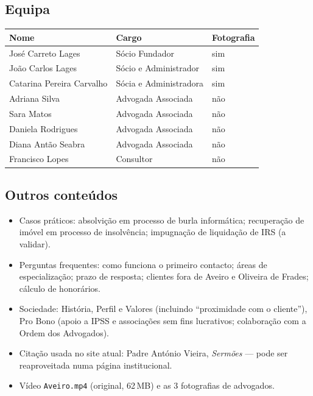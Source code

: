 \documentclass[11pt,a4paper]{article}
\begin{document}
\subsection*{Equipa}
\begin{center}
\begin{tabular}{lll}
\toprule
\textbf{Nome} & \textbf{Cargo} & \textbf{Fotografia} \\
\midrule
José Carreto Lages & Sócio Fundador & sim \\
João Carlos Lages & Sócio e Administrador & sim \\
Catarina Pereira Carvalho & Sócia e Administradora & sim \\
Adriana Silva & Advogada Associada & não \\
Sara Matos & Advogada Associada & não \\
Daniela Rodrigues & Advogada Associada & não \\
Diana Antão Seabra & Advogada Associada & não \\
Francisco Lopes & Consultor & não \\
\bottomrule
\end{tabular}
\end{center}

\subsection*{Outros conteúdos}
\begin{itemize}
  \item Casos práticos: absolvição em processo de burla informática; recuperação de imóvel em processo de insolvência; impugnação de liquidação de IRS (a validar).
  \item Perguntas frequentes: como funciona o primeiro contacto; áreas de especialização; prazo de resposta; clientes fora de Aveiro e Oliveira de Frades; cálculo de honorários.
  \item Sociedade: História, Perfil e Valores (incluindo ``proximidade com o cliente''), Pro Bono (apoio a IPSS e associações sem fins lucrativos; colaboração com a Ordem dos Advogados).
  \item Citação usada no site atual: Padre António Vieira, \textit{Sermões} --- pode ser reaproveitada numa página institucional.
  \item Vídeo \texttt{Aveiro.mp4} (original, 62\,MB) e as 3 fotografias de advogados.
\end{itemize}
\end{document}
